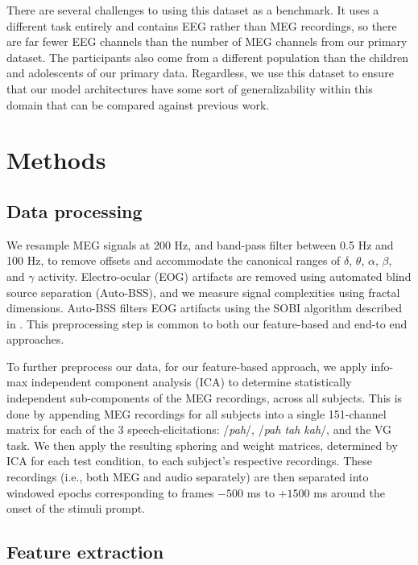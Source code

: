 \documentclass[utf8]{frontiersSCNS} %
\begin{document}
There are several challenges to using this dataset as a benchmark. It uses a different task entirely and contains EEG rather than MEG recordings, so there are far fewer EEG channels than the number of MEG channels from our primary dataset. The participants also come from a different population than the children and adolescents of our primary data. Regardless, we use this dataset to ensure that our model architectures have some sort of generalizability within this domain that can be compared against previous work. 

\section{Methods}


\subsection{Data processing}

We resample MEG signals at 200 Hz, and band-pass filter between 0.5 Hz and 100 Hz, to remove offsets and accommodate the canonical ranges of $\delta$, $\theta$, $\alpha$, $\beta$, and $\gamma$ activity. Electro-ocular (EOG) artifacts are removed using automated blind source separation (Auto-BSS), and we measure signal complexities using fractal dimensions. Auto-BSS filters EOG artifacts using the SOBI algorithm described in \cite{eog}. This preprocessing step is common to both our feature-based and end-to end approaches.

To further preprocess our data, for our feature-based approach, we apply info-max independent component analysis (ICA) \cite{Bell1995} to determine statistically independent sub-components of the MEG recordings, across all subjects. This is done by appending MEG recordings for all subjects into a single 151-channel matrix for each of the 3 speech-elicitations: /{\em pah}/, /{\em pah tah kah}/, and the VG task. We then apply the resulting sphering and weight matrices, determined by ICA for each test condition, to each subject's respective recordings. These recordings (i.e., both MEG and audio separately) are then separated into windowed epochs corresponding to frames $-500$ ms to $+1500$ ms around the onset of the stimuli prompt.

\subsection{Feature extraction}
\end{document}
